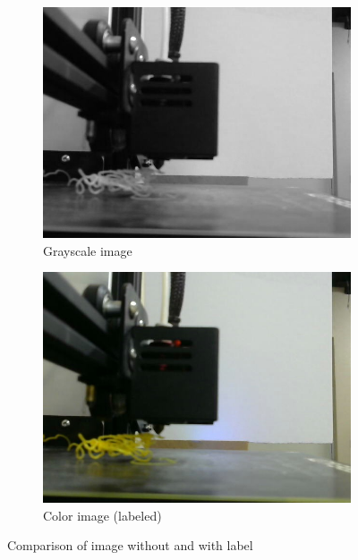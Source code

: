 \documentclass[12pt,a4paper]{article}
\begin{document}
\begin{figure}[h]
    \centering
    \begin{subfigure}[b]{0.45\textwidth}
        \centering
        \includegraphics[width=\textwidth]{no_support_57.jpg}
        \caption{Grayscale image \cite{onlineOpenSource2}}
        \label{fig:image1}
    \end{subfigure}
    \begin{subfigure}[b]{0.45\textwidth}
        \centering
        \includegraphics[width=\textwidth]{no_support_57_color.jpg}
        \caption{Color image (labeled)\cite{onlineOpenSource2}}
        \label{fig:image2}
    \end{subfigure}
    \hfill

    \caption{Comparison of image without and with label}
    \label{fig:test}
\end{figure}
\end{document}
